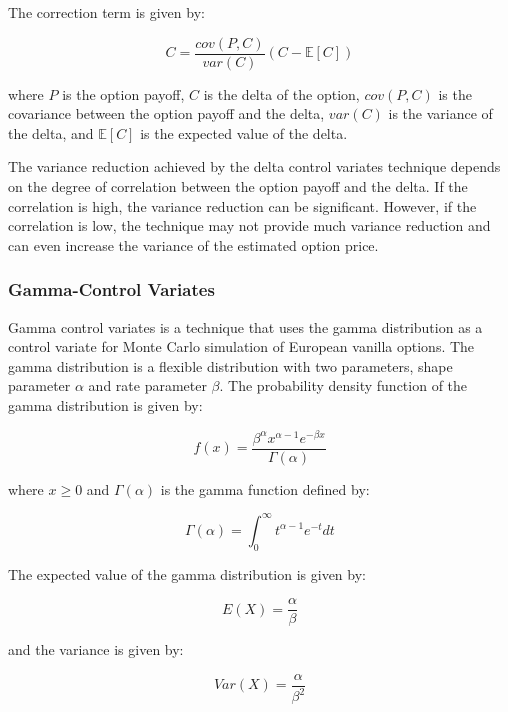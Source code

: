 \documentclass[11pt, a4paper, leqno]{article}
\begin{document}
The correction term is given by:

\begin{equation}
C = \frac{cov(P,C)}{var(C)}(C - \mathbb{E}[C])
\end{equation}

where $P$ is the option payoff, $C$ is the delta of the option, $cov(P,C)$ is the covariance between the option payoff and the delta, $var(C)$ is the variance of the delta, and $\mathbb{E}[C]$ is the expected value of the delta.

The variance reduction achieved by the delta control variates technique depends on the degree of correlation between the option payoff and the delta. If the correlation is high, the variance reduction can be significant. However, if the correlation is low, the technique may not provide much variance reduction and can even increase the variance of the estimated option price.

\subsubsection{Gamma-Control Variates}

Gamma control variates is a technique that uses the gamma distribution as a control variate for Monte Carlo simulation of European vanilla options. The gamma distribution is a flexible distribution with two parameters, shape parameter $\alpha$ and rate parameter $\beta$. The probability density function of the gamma distribution is given by:

\begin{equation}
f(x) = \frac{\beta^{\alpha}x^{\alpha - 1}e^{-\beta x}}{\Gamma(\alpha)}
\end{equation}

where $x \geq 0$ and $\Gamma(\alpha)$ is the gamma function defined by:

\begin{equation}
\Gamma(\alpha) = \int_{0}^{\infty} t^{\alpha - 1} e^{-t} dt
\end{equation}

The expected value of the gamma distribution is given by:

\begin{equation}
E(X) = \frac{\alpha}{\beta}
\end{equation}

and the variance is given by:

\begin{equation}
Var(X) = \frac{\alpha}{\beta^2}
\end{equation}
\end{document}
